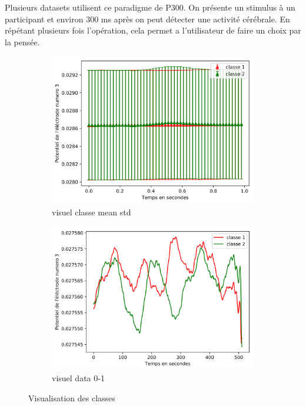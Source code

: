 \documentclass{article}[12pt]
\begin{document}
Plusieurs datasets utilisent ce paradigme de P300. On présente un stimulus à un participant et environ 300 ms après on peut détecter une activité cérébrale. En répétant plusieurs fois l'opération, cela permet a l'utilisateur de faire un choix par la pensée.\\

\begin{figure}[]
	\centering
    \begin{subfigure}[]{0.475\textwidth}
    	\centering
        \includegraphics[width=\textwidth]{images/visuel_classe_mean_std-1.png}
        \caption[Network2]%
            {{\small visuel classe mean std}}    
        \label{fig:mean and std of net14}
	\end{subfigure}
    \hfill
    \begin{subfigure}[]{0.475\textwidth}  
     	\centering 
        \includegraphics[width=\textwidth]{images/visuel_data_0-1.png}
        \caption[]%
            {{\small visuel data 0-1 }}    
        \label{fig:mean and std of net24}
    \end{subfigure}
    \caption[ Visualisation des classes]
        {\small Visualisation des classes} 
    \label{fig:mean and std of nets}
\end{figure}
    
\end{document}
